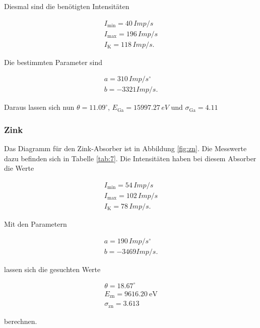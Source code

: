 Diesmal sind die benötigten Intensitäten

\begin{align*}
    I_\text{min} = 40 \, Imp/s \\
    I_\text{max} = 196 \, Imp/s \\
    I_\text{K} = 118 \, Imp/s.
\end{align*}

Die bestimmten Parameter sind

\begin{align*}
    a = 310 \, Imp/s^\circ \\
    b = -3321 Imp/s.
\end{align*}

Daraus lassen sich nun $\theta = 11.09  ^\circ$, $E_\text{Ga} = 15997.27 \, eV$ und $\sigma_\text{Ga} = 4.11$

\subsubsection{Zink}

Das Diagramm für den Zink-Absorber ist in Abbildung \ref{fig:zn}. Die Messwerte dazu befinden sich in Tabelle \ref{tab:7}. Die Intensitäten haben bei diesem Absorber die Werte  

\begin{align*}
    I_\text{min} = 54 \, Imp/s \\
    I_\text{max} = 102 \, Imp/s \\
    I_\text{K} = 78 \, Imp/s.
\end{align*}

Mit den Parametern

\begin{align*}
    a = 190 \, Imp/s^\circ \\
    b = -3469 Imp/s.
\end{align*}

lassen sich die gesuchten Werte 

\begin{align*}
    \theta = 18.67  ^\circ \\
    E_\text{zn} = \SI{9616.20}{\electronvolt}\\
    \sigma_\text{zn} = 3.613
\end{align*}

berechnen.

